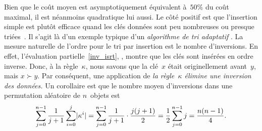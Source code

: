 Bien que le coût moyen est asymptotiquement équivalent à~\(50\%\) du
coût maximal, il est néanmoins quadratique lui aussi. Le côté positif
est que l'insertion simple est plutôt efficace quand les clés données
sont peu nombreuses ou presque triées~\citep{CookKim_1980}. Il s'agit
là d'un exemple typique d'un \emph{algorithme de tri adaptatif}
\citep{EstivillWood_1992,MoffatPetersson_1992}. La mesure naturelle de l'ordre pour le tri
par insertion est le nombre d'inversions. En effet, l'évaluation
partielle~\eqref{inv_isrt}, , montre que les clés
sont insérées en ordre inverse. Donc, à la règle~\(\kappa\), nous
savons que la clé~\(x\) était originellement avant~\(y\), mais \(x
\succ y\). Par conséquent, une application de \emph{la
  règle~\(\kappa\) élimine une inversion des données.} Un corollaire
est que le nombre moyen d'inversions dans une permutation aléatoire de
\(n\)~objets est
\begin{equation*}
\belowdisplayskip=-5pt
\sum_{j=0}^{n-1}\frac{1}{j+1}\sum_{i=0}^{j}\len{\kappa^i} =
\sum_{j=0}^{n-1}\frac{1}{j+1}\cdot\frac{j(j+1)}{2} =
\frac{1}{2}\sum_{j=0}^{n-1}j =
\frac{n(n-1)}{4}.
\end{equation*}

